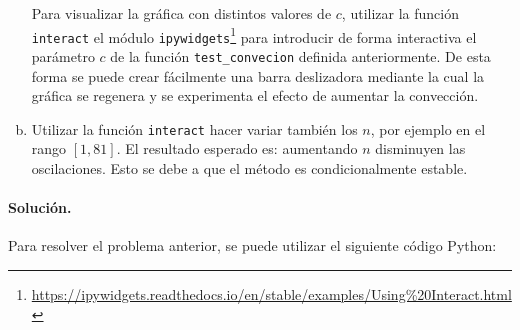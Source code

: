 \documentclass[11pt,spanish,a4wide]{article}
\begin{document}
\begin{enumerate}[a)]
  Para visualizar la gráfica con distintos valores de $c$, utilizar la
  función \texttt{interact} el módulo
  \texttt{ipywidgets}\footnote{\url{https://ipywidgets.readthedocs.io/en/stable/examples/Using\%20Interact.html}}
  para introducir de forma interactiva el parámetro $c$ de la función
  \texttt{test\_convecion} definida anteriormente. De esta forma se
  puede crear fácilmente una barra deslizadora mediante la cual la
  gráfica se regenera y se experimenta el efecto de aumentar la
  convección.


\item Utilizar la función \texttt{interact} hacer variar también los
  $n$, por ejemplo en el rango $[1,81]$. El resultado esperado es: aumentando
  $n$ disminuyen las oscilaciones. Esto se debe a  que el
  método es condicionalmente estable.
\end{enumerate}

\paragraph{Solución.} Para resolver el problema anterior, se puede
utilizar el siguiente código Python:
\end{document}
